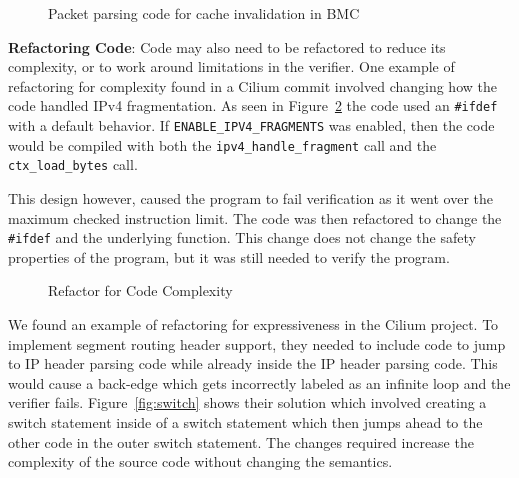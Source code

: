 
\begin{figure}[t]
    
    \caption{Packet parsing code for cache invalidation in BMC}
    \label{fig:bmc-code}
\end{figure}

\noindent\textbf{Refactoring Code}:
Code may also need to be refactored to reduce its complexity, or to work around limitations in the verifier.
One example of refactoring for complexity found in a Cilium commit involved changing how the code handled IPv4 fragmentation.
As seen in Figure~\ref{fig:refactor-fix} the code used an \texttt{\#ifdef} with a default behavior.
If \texttt{ENABLE\_IPV4\_FRAGMENTS} was enabled, then the code would be compiled with both the \texttt{ipv4\_handle\_fragment} call and the \texttt{ctx\_load\_bytes} call.

This design however, caused the program to fail verification as it went over the maximum checked instruction limit.
The code was then refactored to change the \texttt{\#ifdef} and the underlying function.
This change does not change the safety properties of the program, but it was still needed to verify the program.

\begin{figure}
    
    \caption{Refactor for Code Complexity}
    \label{fig:refactor-fix}
\end{figure}


We found an example of refactoring for expressiveness in the Cilium project.
To implement segment routing header support, they needed to include code to jump to IP header parsing code while already inside the IP header parsing code.
This would cause a back-edge which gets incorrectly labeled as an infinite loop and the verifier fails.
Figure~\ref{fig:switch} shows their solution which involved creating a switch statement inside of a switch statement which then jumps ahead to the other code in the outer switch statement.
The changes required increase the complexity of the source code without changing the semantics.

